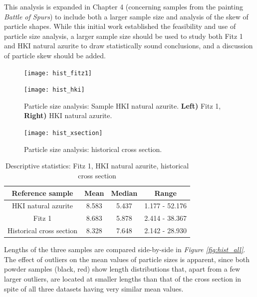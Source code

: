 This analysis is expanded in Chapter 4 (concerning samples from the painting \textit{Battle of Spurs}) to include both a larger sample size and analysis of the skew of particle shapes. While this initial work established the feasibility and use of particle size analysis, a larger sample size should be used to study both Fitz 1 and HKI natural azurite to draw statistically sound conclusions, and a discussion of particle skew should be added.

\begin{figure}[H]
\centering
\begin{minipage}{.45\textwidth}
  \centering
  \texttt{[image: hist\_fitz1]}
\end{minipage}
\begin{minipage}{.45\textwidth}
  \centering
  \texttt{[image: hist\_hki]}
\end{minipage}
\caption[Particle size analysis: HKI natural azurite, Fitz 1]{Particle size analysis: Sample HKI natural azurite. \textbf{Left)} Fitz 1, \textbf{Right)} HKI natural azurite.}
\label{fig:histogram_length}
\end{figure}

\begin{figure}[H]
\centering
  \texttt{[image: hist\_xsection]}
\caption[Particle size analysis: historical cross section]{Particle size analysis: historical cross section.} 
\label{fig:hist_xsec}
\end{figure}

\begin{table}[H]
\caption{Descriptive statistics: Fitz 1, HKI natural azurite, historical cross section}
\centering
\label{table:r_stats}
\begin{tabular}{c c c c}
\toprule
Reference sample & Mean & Median & Range \\
\midrule
HKI natural azurite & 8.583 & 5.437 & 1.177 - 52.176 \\
Fitz 1 & 8.683 & 5.878 & 2.414 - 38.367 \\
Historical cross section & 8.328 & 7.648 & 2.142 - 28.930 \\
\bottomrule
\end{tabular}
\end{table}

Lengths of the three samples are compared side-by-side in \textit{Figure \ref{fig:hist_all}}. The effect of outliers on the mean values of particle sizes is apparent, since both powder samples (black, red) show length distributions that, apart from a few larger outliers, are located at smaller lengths than that of the cross section in spite of all three datasets having very similar mean values. 

